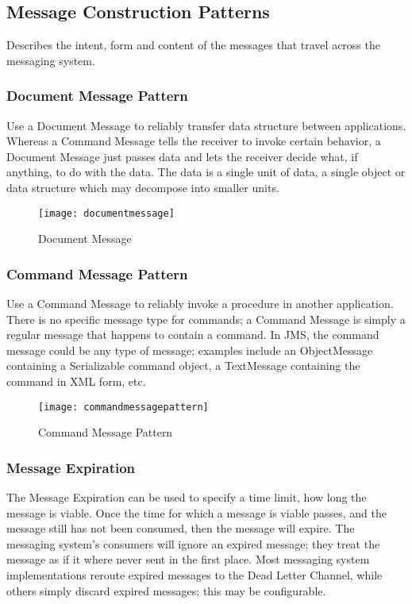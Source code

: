 \pagebreak

\subsection{Message Construction Patterns}
Describes the intent, form and content of the messages that travel across the messaging system.

\subsubsection{Document Message Pattern}
Use a Document Message to reliably transfer data structure between applications. Whereas a Command Message tells the receiver to invoke certain behavior, a Document Message just passes data and lets the receiver decide what, if anything, to do with the data. The data is a single unit of data, a single object or data structure which may decompose into smaller units.

\begin{figure}[H]
  \center
  \texttt{[image: documentmessage]}
  \caption{Document Message}
\end{figure}

\subsubsection{Command Message Pattern}
Use a Command Message to reliably invoke a procedure in another application. There is no specific message type for commands; a Command Message is simply a regular message that happens to contain a command. In JMS, the command message could be any type of message; examples include an ObjectMessage containing a Serializable command object, a TextMessage containing the command in XML form, etc.

\begin{figure}[H]
  \center
  \texttt{[image: commandmessagepattern]}
  \caption{Command Message Pattern}
\end{figure}

\subsubsection{Message Expiration}
The Message Expiration can be used to specify a time limit, how long the message is viable. Once the time for which a message is viable passes, and the message still has not been consumed, then the message will expire. The messaging system’s consumers will ignore an expired message; they treat the message as if it where never sent in the first place. Most messaging system implementations reroute expired messages to the Dead Letter Channel, while others simply discard expired messages; this may be configurable.

